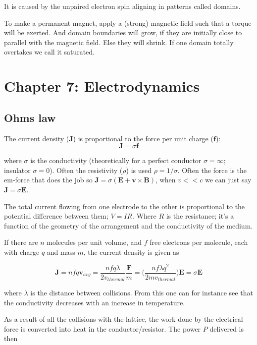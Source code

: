 \documentclass[a4paper]{article}
\begin{document}
It is caused by the unpaired electron spin aligning in patterns called domains. 

To make a permanent magnet, apply a (strong) magnetic field such that a torque will be exerted. And domain boundaries will grow, if they are initially close to parallel with the magnetic field. Else they will shrink. If one domain totally overtakes we call it saturated.

\section{Chapter 7: Electrodynamics}

\subsection{Ohms law}
The current density ($\bm{J}$) is proportional to the force per unit charge ($\bm{f}$):
\begin{equation}
    \bm{J}=\sigma\bm{f}
\end{equation}

where $\sigma$ is the conductivity (theoretically for a perfect conductor $\sigma=\infty$; insulator $\sigma=0$). Often the resistivity ($\rho$) is used $\rho = 1 / \sigma$. Often the force is the em-force that does the job so $\bm{J}=\sigma(\bm{E}+\bm{v}\times\bm{B})$, when $v<<c$ we can just say $\bm{J}=\sigma\bm{E}$. 

\bigskip

The total current flowing from one electrode to the other is proportional to the potential difference between them; $V=IR$. Where $R$ is the resistance; it's a function of the geometry of the arrangement and the conductivity of the medium. 

\bigskip

If there are $n$ molecules per unit volume, and $f$ free electrons per molecule, each with charge $q$ and mass $m$, the current density is given as

\begin{equation}
    \bm{J}=nfq\bm{v}_{avg}=\frac{nfq\lambda}{2v_{thermal}}\frac{\bm{F}}{m}=\bigg(\frac{nf\lambda q^2}{2mv_{thermal}}\bigg)\bm{E}=\sigma\bm{E}
\end{equation}

where $\lambda$ is the distance between collisions. From this one can for instance see that the conductivity decreases with an increase in temperature. 

\bigskip

As a result of all the collisions with the lattice, the work done by the electrical force is converted into heat in the conductor/resistor. The power $P$ delivered is then 
\end{document}
